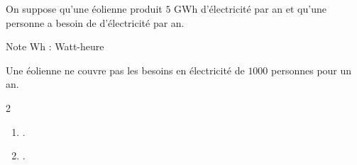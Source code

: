 \begin{exercice*}
    On suppose qu'une éolienne produit $5$ GWh d'électricité par an et qu'une
    personne a besoin de  d'électricité par an.

    \begin{myBox}{Note}
        Wh : Watt-heure
    \end{myBox}

    Une éolienne ne couvre pas les besoins en électricité de $\num{1000}$ personnes pour un an.
\end{exercice*}
\begin{corrige}
    \phantom{rrr}    
    \begin{multicols}2
        \begin{enumerate}
            \item .
            \item .
        \end{enumerate}
    \end{multicols}
\end{corrige}

